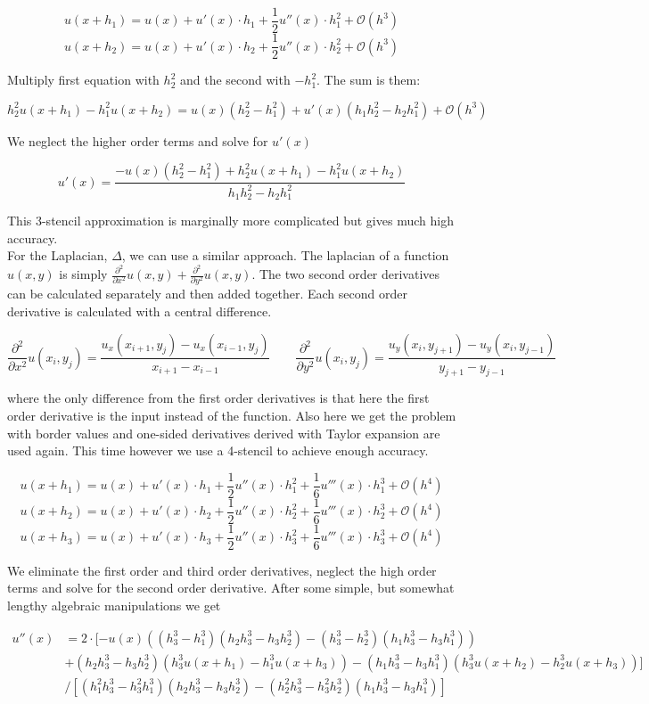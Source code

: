 \documentclass[paper=a4, fontsize=12pt]{article} %
\begin{document}
$$u(x+h_1) = u(x) + u'(x)\cdot h_1 + \frac{1}{2}u''(x)\cdot h_1^2 + \mathcal{O}(h^3)$$
$$u(x+h_2) = u(x) + u'(x)\cdot h_2 + \frac{1}{2}u''(x)\cdot h_2^2 + \mathcal{O}(h^3)$$

Multiply first equation with $h_2^2$ and the second with $-h_1^2$. The sum is them:

$$ h_2^2 u(x+h_1)  - h_1^2 u(x+h_2)  = u(x) (h_2^2 - h_1^2 ) + u'(x) (h_1 h_2^2 - h_2 h_ 1^2) +  \mathcal{O}(h^3) $$

We neglect the higher order terms and solve for $u'(x)$

$$  u'(x) = \frac{- u(x) (h_2^2 - h_1^2 ) + h_2^2 u(x+h_1)  - h_1^2 u(x+h_2) }{h_1 h_2^2 - h_2 h_ 1^2}  $$

This 3-stencil approximation is marginally more complicated but gives much high accuracy. \\


For the Laplacian, $\Delta$, we can use a similar approach. The laplacian of a function $u(x,y) $ is simply $\frac{\partial^2}{\partial x^2} u(x,y) + \frac{\partial^2}{\partial y^2} u(x,y) $. The two second order derivatives can be calculated separately and then added together. Each second order derivative is calculated with a central difference. 

$$ \frac{\partial^2}{\partial x^2} u(x_i,y_j)  = \frac{u_x(x_{i+1},y_j)-u_x(x_{i-1},y_j)}{x_{i+1} - x_{i-1}} \qquad  \frac{\partial^2}{\partial y^2} u(x_i,y_j)  = \frac{u_y(x_{i},y_{j+1})-u_y(x_{i},y_{j-1})}{y_{j+1} - y_{j-1}}$$ 

where the only difference from the first order derivatives is that here the first order derivative is the input instead of the function. Also here we get the problem with border values and one-sided derivatives derived with Taylor expansion are used again. This time however we use a 4-stencil to achieve enough accuracy.

$$u(x+h_1) = u(x) + u'(x)\cdot h_1 + \frac{1}{2}u''(x)\cdot h_1^2 + \frac{1}{6}u'''(x)\cdot h_1^3 + \mathcal{O}(h^4)$$
$$u(x+h_2) = u(x) + u'(x)\cdot h_2 + \frac{1}{2}u''(x)\cdot h_2^2 + \frac{1}{6}u'''(x)\cdot h_2^3 + \mathcal{O}(h^4)$$
$$u(x+h_3) = u(x) + u'(x)\cdot h_3 + \frac{1}{2}u''(x)\cdot h_3^2 + \frac{1}{6}u'''(x)\cdot h_3^3 + \mathcal{O}(h^4)$$

We eliminate the first order and third order derivatives, neglect the high order terms and solve for the second order derivative. After some simple, but somewhat lengthy algebraic manipulations we get

\begin{align*}
u''(x) &= 2\cdot [ -u(x)((h_3^3 - h_1^3)(h_2h_3^3 - h_3h_2^3)-(h_3^3-h_2^3)(h_1h_3^3-h_3h_1^3))  \\
& + (h_2h_3^3 - h_3h_2^3)(h_3^3u(x+h_1)-h_1^3u(x+h_3))  - (h_1h_3^3 - h_3h_1^3 )(h_3^3 u(x+h_2) -h_2^3 u(x+h_3)) ]\\
&  /  [(h_1^2 h_3^3 - h_3^2 h_1^3 )(h_2 h_3^3 - h_3 h_2^3 )-( h_2^2 h_3^3 - h_3^2 h_2^3 )(h_1 h_3^3 - h_3 h_1^3) ]
\end{align*}
\end{document}
